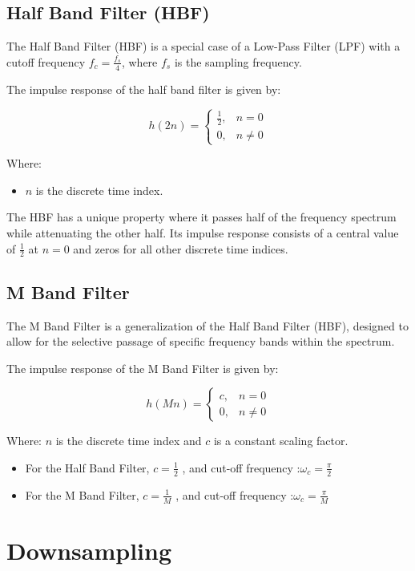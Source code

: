 \documentclass{article}
\begin{document}
\subsection{Half Band Filter (HBF)}

The Half Band Filter (HBF) is a special case of a Low-Pass Filter (LPF) with a cutoff frequency \(f_c = \frac{f_s}{4}\), where \(f_s\) is the sampling frequency.

The impulse response of the half band filter is given by:

\[
h{(2n)} = \begin{cases}
    \frac{1}{2}, & n = 0 \\
    0, & n \neq 0
\end{cases}
\]

Where:
\begin{itemize}
  \item \(n\) is the discrete time index.
\end{itemize}

The HBF has a unique property where it passes half of the frequency spectrum while attenuating the other half. Its impulse response consists of a central value of \(\frac{1}{2}\) at \(n = 0\) and zeros for all other discrete time indices.
\subsection{M Band Filter}

The M Band Filter is a generalization of the Half Band Filter (HBF), designed to allow for the selective passage of specific frequency bands within the spectrum.

The impulse response of the M Band Filter is given by:

\[
h{(Mn)} = \begin{cases}
    {c}, & n = 0 \\
    0, & n \neq 0
\end{cases}
\]

Where:
 \(n\) is the discrete time index and
\(c\) is a constant scaling factor.

\begin{itemize}
 \item For the Half Band Filter, \(c = \frac{1}{2}\) , and cut-off frequency :$\omega_c= \frac{\pi}{2}$
  \item For the M Band Filter, \(c = \frac{1}{M}\) , and cut-off frequency :$\omega_c= \frac{\pi}{M}$
 \end{itemize}
  
\section{Downsampling}
\end{document}
